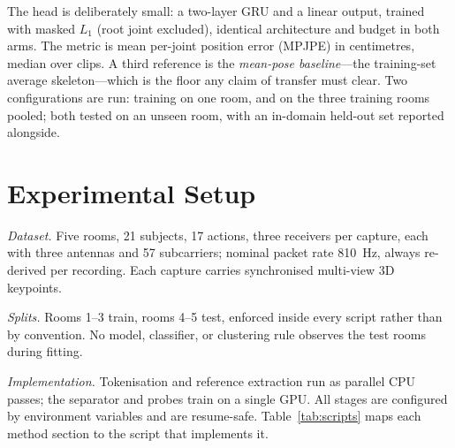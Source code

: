 \documentclass[conference]{IEEEtran}
\begin{document}
The head is deliberately small: a two-layer GRU and a linear output, trained
with masked $L_1$ (root joint excluded), identical architecture and budget in
both arms. The metric is mean per-joint position error (MPJPE) in centimetres,
median over clips. A third reference is the \emph{mean-pose baseline}---the
training-set average skeleton---which is the floor any claim of transfer must
clear. Two configurations are run: training on one room, and on the three
training rooms pooled; both tested on an unseen room, with an in-domain
held-out set reported alongside.

\section{Experimental Setup}
\label{sec:setup}

\emph{Dataset.} Five rooms, \num{21} subjects, \num{17} actions, three
receivers per capture, each with three antennas and \num{57} subcarriers;
nominal packet rate \SI{810}{\hertz}, always re-derived per recording. Each
capture carries synchronised multi-view 3D keypoints.

\emph{Splits.} Rooms 1--3 train, rooms 4--5 test, enforced inside every script
rather than by convention. No model, classifier, or clustering rule observes
the test rooms during fitting.

\emph{Implementation.} Tokenisation and reference extraction run as parallel
CPU passes; the separator and probes train on a single GPU. All stages are
configured by environment variables and are resume-safe.
Table~\ref{tab:scripts} maps each method section to the script that implements
it.
\end{document}
